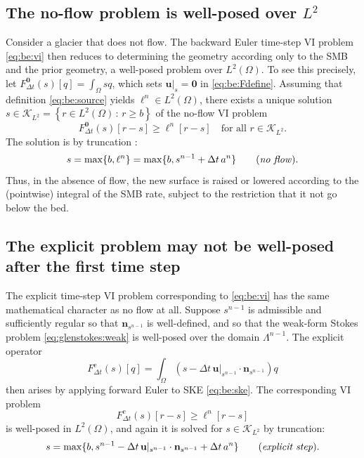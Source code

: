 \documentclass[hidelinks,onefignum,onetabnum,final]{siamart220329}  %
\newcommand{\bn}{\mathbf{n}}
\newcommand{\bu}{\mathbf{u}}
\newcommand{\bzero}{\bm{0}}
\newcommand{\cK}{\mathcal{K}}
\begin{document}
\subsection{The no-flow problem is well-posed over $L^2$} \label{subsec:noflow}   Consider a glacier that does not flow.  The backward Euler time-step VI problem \eqref{eq:be:vi} then reduces to determining the geometry according only to the SMB and the prior geometry, a well-posed problem over $L^2(\Omega)$.  To see this precisely, let $F^{\bzero}_{\Delta t}(s)[q] = \int_\Omega sq$, which sets $\bu|_s=\bzero$ in \eqref{eq:be:Fdefine}.  Assuming that definition \eqref{eq:be:source} yields $\ell^n \in L^2(\Omega)$, there exists a unique solution $s \in \cK_{L^2} = \left\{r\in L^2(\Omega)\,:\,r \ge b\right\}$ of the no-flow VI problem
\begin{equation}
F^{\bzero}_{\Delta t}(s)[r-s] \ge \ell^n[r-s] \quad \text{for all } r \in \cK_{L^2}.
\end{equation}
The solution is by truncation \cite[section II.3]{KinderlehrerStampacchia1980}:
\begin{equation}
s = \max\{b, \ell^n\} = \max\{b, s^{n-1} + \Delta t\,a^n\} \qquad (\text{\emph{no flow}}).
\end{equation}
Thus, in the absence of flow, the new surface is raised or lowered according to the (pointwise) integral of the SMB rate, subject to the restriction that it not go below the bed.

\subsection{The explicit problem may not be well-posed after the first time step} \label{subsec:explicit}   The explicit time-step VI problem corresponding to \eqref{eq:be:vi} has the same mathematical character as no flow at all.  Suppose $s^{n-1}$ is admissible and sufficiently regular so that $\bn_{s^{n-1}}$ is well-defined, and so that the weak-form Stokes problem \eqref{eq:glenstokes:weak} is well-posed over the domain $\Lambda^{n-1}$.  The explicit operator
\begin{equation}
F^{\text{e}}_{\Delta t}(s)[q] = \int_\Omega \left(s - \Delta t\, \bu|_{s^{n-1}} \cdot \bn_{s^{n-1}}\right) q  \label{eq:explicitFdefine}
\end{equation}
then arises by applying forward Euler to SKE \eqref{eq:be:ske}.  The corresponding VI problem
\begin{equation}
F^{\text{e}}_{\Delta t}(s)[r-s] \ge \ell^n[r-s]
\end{equation}
is well-posed in $L^2(\Omega)$, and again it is solved for $s \in \cK_{L^2}$ by truncation:
\begin{equation}
s = \max\{b, s^{n-1} - \Delta t\, \bu|_{s^{n-1}} \cdot \bn_{s^{n-1}} + \Delta t\,a^n\} \qquad (\text{\emph{explicit step}}). \label{eq:explicits}
\end{equation}
\end{document}
